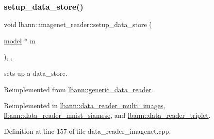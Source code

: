 \subsubsection{\texorpdfstring{setup\+\_\+data\+\_\+store()}{setup\_data\_store()}}
{\footnotesize\ttfamily void lbann\+::imagenet\+\_\+reader\+::setup\+\_\+data\+\_\+store (\begin{DoxyParamCaption}\item[{\hyperlink{classlbann_1_1model}{model} $\ast$}]{m }\end{DoxyParamCaption})\hspace{0.3cm}{\ttfamily [override]}, {\ttfamily [protected]}, {\ttfamily [virtual]}}



sets up a data\+\_\+store. 



Reimplemented from \hyperlink{classlbann_1_1generic__data__reader_a8b2a09d38512fc11f1b9d572c89100a7}{lbann\+::generic\+\_\+data\+\_\+reader}.



Reimplemented in \hyperlink{classlbann_1_1data__reader__multi__images_ac4c70724fe5f1378a81394cc2e686297}{lbann\+::data\+\_\+reader\+\_\+multi\+\_\+images}, \hyperlink{classlbann_1_1data__reader__mnist__siamese_a410d8aa510fb2f3f4d1a257d5b308819}{lbann\+::data\+\_\+reader\+\_\+mnist\+\_\+siamese}, and \hyperlink{classlbann_1_1data__reader__triplet_a2cd6fd46a7d2d90ccd754404683834c6}{lbann\+::data\+\_\+reader\+\_\+triplet}.



Definition at line 157 of file data\+\_\+reader\+\_\+imagenet.\+cpp.



